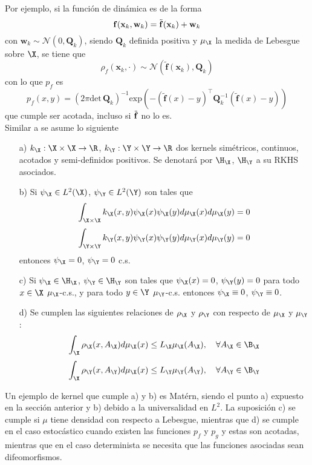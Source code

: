 Por ejemplo, si la función de dinámica es de la forma
$$\mathbf{f}(\mathbf{x}_k, \mathbf{w}_k) = \Tilde{\mathbf{f}}(\mathbf{x}_k) + \mathbf{w}_k$$ 
con $\mathbf{w}_k \sim \mathcal{N}(0, \mathbf{Q}_k)$, siendo $\mathbf{Q}_k$ definida positiva y $\mu_\X$ la medida de Lebesgue sobre $\X$, se tiene que 
\begin{equation*}
	\rho_f (\mathbf{x}_k, \cdot) \sim \mathcal{N}(\tilde{\mathbf{f}}(\mathbf{x}_k), \mathbf{Q}_k)
\end{equation*}
con lo que $p_f$ es
\begin{equation*}
	p_f(x, y) = (2 \pi \text{det} \, \mathbf{Q}_k )^{-1} \text{exp} \left ( -(\tilde{\mathbf{f}}(x) - y)^\top \mathbf{Q}_k^{-1} (\tilde{\mathbf{f}}(x) - y) \right ) 
\end{equation*}
que cumple ser acotada, incluso si $\Tilde{\mathbf{f}}$ no lo es.\\
Similar a \cite{Philipp2024} se asume lo siguiente
\begin{enumerate}
    \item[a)] $k_\X:\X \times \X \to \R$, $k_\Y: \Y \times \Y \to \R$ dos kernels simétricos, continuos, acotados y semi-definidos positivos. Se denotará por $\H_\X$, $\H_\Y$ a su RKHS asociados.
    \item[b)] Si $\psi_\X \in L^2(\X)$, $\psi_\Y \in L^2(\Y)$ son tales que 
    \begin{equation*}
        \int_{\X \times \X} k_\X(x,y) \psi_\X (x) \psi_\X (y) d \mu_\X (x) d \mu_\X (y) = 0 
    \end{equation*}
      \begin{equation*}
    	\int_{\Y \times \Y} k_\Y(x,y) \psi_\Y (x) \psi_\Y (y) d \mu_\Y (x) d \mu_\Y (y) = 0 
    \end{equation*}
    entonces $\psi_\X = 0$, $\psi_\Y = 0$ c.s.
    \item[c)] Si $\psi_\X \in \H_\X$, $\psi_\Y \in \H_\Y$ son tales que $\psi_\X(x) = 0$, $\psi_\Y(y) = 0$ para todo $x \in \X$ $\mu_\X$-c.s., y para todo $y \in \Y$ $\mu_\Y$-c.s. entonces $\psi_\X \equiv 0$, $\psi_\Y \equiv 0$.
    \item[d)] Se cumplen las siguientes relaciones de $\rho_\X$ y $\rho_\Y$ con respecto de $\mu_\X$ y $\mu_\Y$:
    \begin{equation*}
        \int_\X \rho_\X (x, A_\X) d\mu_\X (x) \leq L_\X \mu_\X (A_\X), \quad \forall A_\X \in \B_\X
    \end{equation*}
    \begin{equation*}
    	\int_\X \rho_\Y (x, A_\Y) d\mu_\X (x) \leq L_\Y \mu_\Y (A_\Y), \quad  \forall A_\Y \in \B_\Y
    \end{equation*}
\end{enumerate}
Un ejemplo de kernel que cumple a) y b) es Matérn, siendo el punto a) expuesto en la sección anterior y b) debido a la universalidad en $L^2$. La suposición c) se cumple si $\mu$ tiene densidad con respecto a Lebesgue, mientras que d) se cumple en el caso estocástico cuando existen las funciones $p_f$ y $p_g$ y estas son acotadas, mientras que en el caso determinista se necesita que las funciones asociadas sean difeomorfismos.

